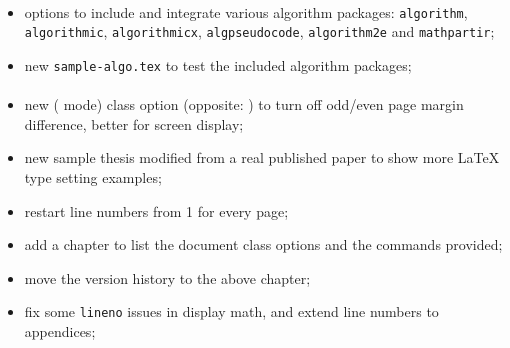 \paragraph{}
	\begin{itemize}[noitemsep]
        \item options to include and integrate various algorithm packages: {\tt algorithm}, {\tt algorithmic}, {\tt algorithmicx}, {\tt algpseudocode}, {\tt algorithm2e} and {\tt mathpartir};

        \item new {\tt sample-algo.tex} to test the included algorithm packages;
	\end{itemize}

\paragraph{}
	\begin{itemize}[noitemsep]
        \item new ( mode) class option  (opposite: ) to turn off odd/even page margin difference, better for screen display;

        \item new sample thesis modified from a real published paper to show more {\LaTeX} type setting examples;

        \item restart line numbers from 1 for every page;

        \item add a chapter to list the document class options and the commands provided;

        \item move the version history to the above chapter;

        \item fix some {\tt lineno} issues in display math, and extend line numbers to appendices;
	\end{itemize}

